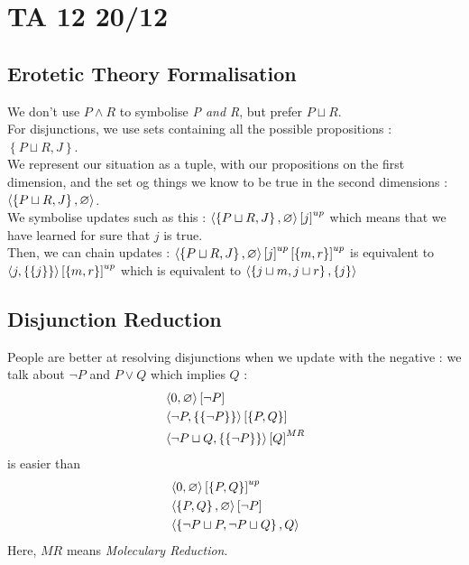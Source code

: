 \documentclass{cours}
\begin{document}
\section{TA 12 20/12}
\subsection{Erotetic Theory Formalisation}
We don't use $P \land R$ to symbolise \textsl{P and R}, but prefer $P\sqcup R$. \\
For disjunctions, we use sets containing all the possible propositions : $\left\{P \sqcup R, J\right\}$. \\
We represent our situation as a tuple, with our propositions on the first dimension, and the set og things we know to be true in the second dimensions : $\left\langle \left\{P \sqcup R, J\right\}, \varnothing \right\rangle$. \\
We symbolise updates such as this : $\left\langle \left\{P \sqcup R, J\right\}, \varnothing \right\rangle\left[j\right]^{up}$ which means that we have learned for sure that $j$ is true. \\
Then, we can chain updates : $\left\langle \left\{P \sqcup R, J\right\}, \varnothing \right\rangle\left[j\right]^{up}\left[\left\{m, r\right\}\right]^{up}$ is equivalent to $\left\langle j, \left\{\left\{j\right\}\right\} \right\rangle\left[\left\{m, r\right\}\right]^{up}$ which is equivalent to $\left\langle \left\{j\sqcup m, j \sqcup r\right\}, \{j\} \right\rangle$

\subsection{Disjunction Reduction}
People are better at resolving disjunctions when we update with the negative : we talk about $\lnot P$ and $P \lor Q$ which implies $Q$ :
\[
    \begin{aligned}
        &\left\langle 0, \varnothing \right\rangle\left[\lnot P\right]\\
        &\left\langle \lnot P, \left\{\{\lnot P\}\right\} \right\rangle\left[\left\{P, Q\right\}\right]\\
        &\left\langle \lnot P \sqcup Q, \left\{\left\{\lnot P\right\}\right\} \right\rangle\left[Q\right]^{MR}
    \end{aligned} 
\]
is easier than 
\[
    \begin{aligned}
        &\left\langle 0, \varnothing \right\rangle\left[\left\{P, Q\right\}\right]^{up}\\
        &\left\langle \left\{P, Q\right\}, \varnothing \right\rangle[\lnot P]\\
        &\left\langle \left\{\lnot P \sqcup P, \lnot P \sqcup Q\right\}, Q \right\rangle
    \end{aligned}
\]
Here, $MR$ means \textit{Moleculary Reduction}.
\end{document}
